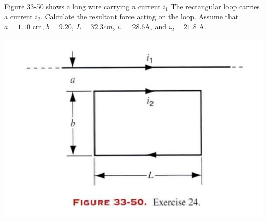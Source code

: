 \documentclass[11pt,letterpaper,boxed]{hmcpset}
\begin{document}
\begin{problem}
Figure 33-50 shows a long wire carrying a current $i_1$ The rectangular loop carries a current $i_2$. Calculate the resultant force acting on the loop. Assume that $a= 1.10$ cm, $b= 9.20$, $L=32.3 cm$, $i_1=28.6$A, and $i_2=21.8$ A.
\begin{center}
\includegraphics[scale=0.6]{33-50.png}
\end{center}
\end{problem}

\begin{solution}
\vfill
\end{solution}
\newpage
\end{document}
